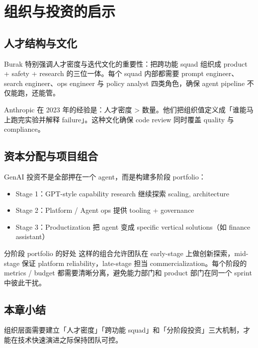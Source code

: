 \section{组织与投资的启示}

\subsection{人才结构与文化}

Burak 特别强调人才密度与迭代文化的重要性：把跨功能 squad 组织成 product + safety + research 的三位一体。每个 squad 内部都需要 prompt engineer、search engineer、ops engineer 与 policy analyst 四类角色，确保 agent pipeline 不仅能跑，还能管。

Anthropic 在 2023 年的经验是：人才密度 > 数量。他们把组织值定义成「谁能马上跑完实验并解释 failure」。这种文化确保 code review 同时覆盖 quality 与 compliance。

\subsection{资本分配与项目组合}

GenAI 投资不是全部押在一个 agent，而是构建多阶段 portfolio：

\begin{itemize}
    \item Stage 1：GPT-style capability research 继续探索 scaling, architecture
    \item Stage 2：Platform / Agent ops 提供 tooling + governance
    \item Stage 3：Productization 把 agent 变成 specific vertical solutions（如 finance assistant）
\end{itemize}

\begin{importantbox}{分阶段 portfolio 的好处}
这样的组合允许团队在 early-stage 上做创新探索，mid-stage 保证 platform reliability，late-stage 担当 commercialization。每个阶段的 metrics / budget 都需要清晰分离，避免能力部门和 product 部门在同一个 sprint 中彼此干扰。
\end{importantbox}

\subsection{本章小结}

组织层面需要建立「人才密度」「跨功能 squad」和「分阶段投资」三大机制，才能在技术快速演进之际保持团队可控。


